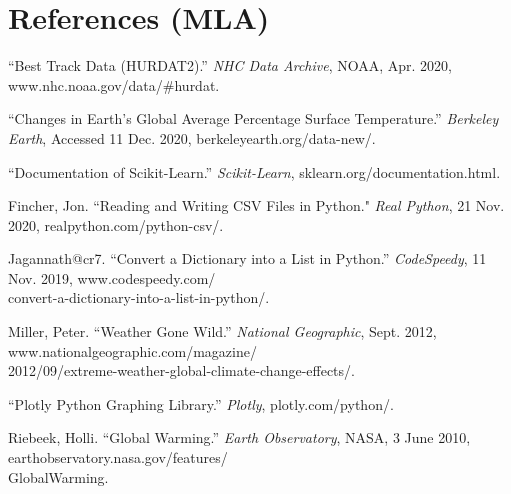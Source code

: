 \documentclass[fontsize=11pt]{article}
\begin{document}
\section*{References (MLA)}

\begin{hangparas}{0.5in}{1}

“Best Track Data (HURDAT2).” \textit{NHC Data Archive}, NOAA, Apr. 2020, www.nhc.noaa.gov/data/\#hurdat.

\bigskip

“Changes in Earth's Global Average Percentage Surface Temperature.” \textit{Berkeley Earth}, Accessed 11 Dec. 2020, berkeleyearth.org/data-new/.

\bigskip

“Documentation of Scikit-Learn.” \textit{Scikit-Learn}, sklearn.org/documentation.html.

\bigskip

Fincher, Jon. ``Reading and Writing CSV Files in Python." \textit{Real Python}, 21 Nov. 2020, realpython.com/python-csv/.

\bigskip

Jagannath@cr7. “Convert a Dictionary into a List in Python.” \textit{CodeSpeedy}, 11 Nov. 2019, www.codespeedy.com/\\convert-a-dictionary-into-a-list-in-python/.

\bigskip

Miller, Peter. “Weather Gone Wild.” \textit{National Geographic}, Sept. 2012, www.nationalgeographic.com/magazine/\\2012/09/extreme-weather-global-climate-change-effects/.

\bigskip

“Plotly Python Graphing Library.” \textit{Plotly}, plotly.com/python/.

\bigskip

Riebeek, Holli. “Global Warming.” \textit{Earth Observatory}, NASA, 3 June 2010, earthobservatory.nasa.gov/features/\\GlobalWarming.



\end{hangparas}
\end{document}
